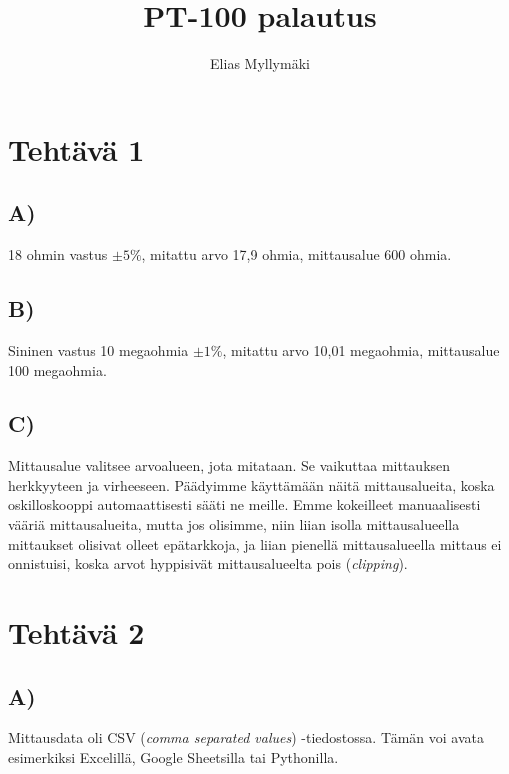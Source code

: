 \documentclass{article}
\title{PT-100 palautus}
\author{Elias Myllymäki}
\begin{document}
\maketitle







\section*{Tehtävä 1}

\subsection*{A)}
18 ohmin vastus $\pm 5\%$, mitattu arvo 17,9 ohmia, mittausalue 600 ohmia.

\subsection*{B)}
Sininen vastus 10 megaohmia $\pm 1\%$, mitattu arvo 10,01 megaohmia, mittausalue 100 megaohmia.

\subsection*{C)}
Mittausalue valitsee arvoalueen, jota mitataan. Se vaikuttaa mittauksen herkkyyteen ja virheeseen. 
Päädyimme käyttämään näitä mittausalueita, koska oskilloskooppi automaattisesti sääti ne meille.
Emme kokeilleet manuaalisesti vääriä mittausalueita, mutta jos olisimme, niin liian isolla mittausalueella 
mittaukset olisivat olleet epätarkkoja, ja liian pienellä mittausalueella mittaus ei onnistuisi, 
koska arvot hyppisivät mittausalueelta pois (\textit{clipping}).

\section*{Tehtävä 2}

\subsection*{A)}
Mittausdata oli CSV (\textit{comma separated values}) -tiedostossa. 
Tämän voi avata esimerkiksi Excelillä, Google Sheetsilla tai Pythonilla.
\end{document}
